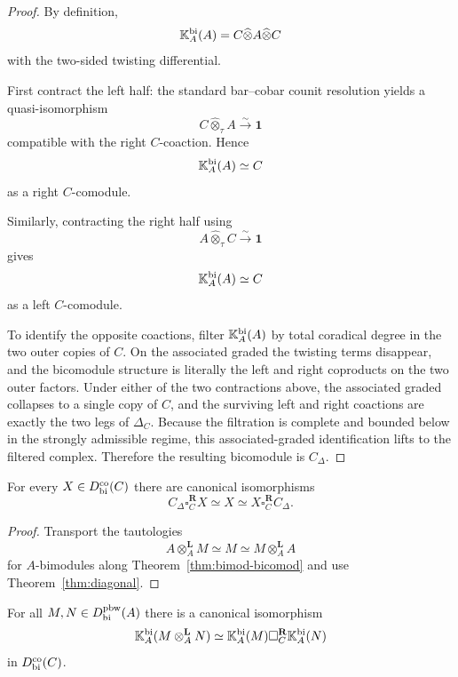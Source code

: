 \begin{proof}
By definition,
\[
\mathbb{K}_A^{\mathrm{bi}}(A)=C\widehat\otimes A\widehat\otimes C
\]
with the two-sided twisting differential.

First contract the left half:
the standard bar--cobar counit resolution yields a quasi-isomorphism
\[
C\widehat\otimes_\tau A\xrightarrow{\sim} \mathbf 1
\]
compatible with the right $C$-coaction. Hence
\[
\mathbb{K}_A^{\mathrm{bi}}(A)\simeq C
\]
as a right $C$-comodule.

Similarly, contracting the right half using
\[
A\widehat\otimes_\tau C\xrightarrow{\sim}\mathbf 1
\]
gives
\[
\mathbb{K}_A^{\mathrm{bi}}(A)\simeq C
\]
as a left $C$-comodule.

To identify the opposite coactions, filter $\mathbb{K}_A^{\mathrm{bi}}(A)$ by total coradical degree in the
two outer copies of $C$. On the associated graded the twisting terms disappear, and the bicomodule
structure is literally the left and right coproducts on the two outer factors. Under either of the
two contractions above, the associated graded collapses to a single copy of $C$, and the surviving
left and right coactions are exactly the two legs of $\Delta_C$. Because the filtration is complete
and bounded below in the strongly admissible regime, this associated-graded identification lifts to
the filtered complex. Therefore the resulting bicomodule is $C_\Delta$.
\end{proof}

\begin{corollary}
\ClaimStatusProvedHere
\label{cor:unit}
For every $X\in D^{\mathrm{co}}_{\mathrm{bi}}(C)$ there are canonical isomorphisms
\[
C_\Delta \square_C^{\mathbf R} X \simeq X \simeq X \square_C^{\mathbf R} C_\Delta.
\]
\end{corollary}

\begin{proof}
Transport the tautologies
\[
A\otimes_A^{\mathbf L} M\simeq M\simeq M\otimes_A^{\mathbf L} A
\]
for $A$-bimodules along Theorem~\ref{thm:bimod-bicomod} and use
Theorem~\ref{thm:diagonal}.
\end{proof}

\begin{corollary}
\ClaimStatusProvedHere
\label{cor:tensor-cotensor}
For all $M,N\in D^{\mathrm{pbw}}_{\mathrm{bi}}(A)$ there is a canonical isomorphism
\[
\mathbb{K}_A^{\mathrm{bi}}(M\otimes_A^{\mathbf L} N)
\simeq
\mathbb{K}_A^{\mathrm{bi}}(M)\square_C^{\mathbf R}\mathbb{K}_A^{\mathrm{bi}}(N)
\]
in $D^{\mathrm{co}}_{\mathrm{bi}}(C)$.
\end{corollary}

